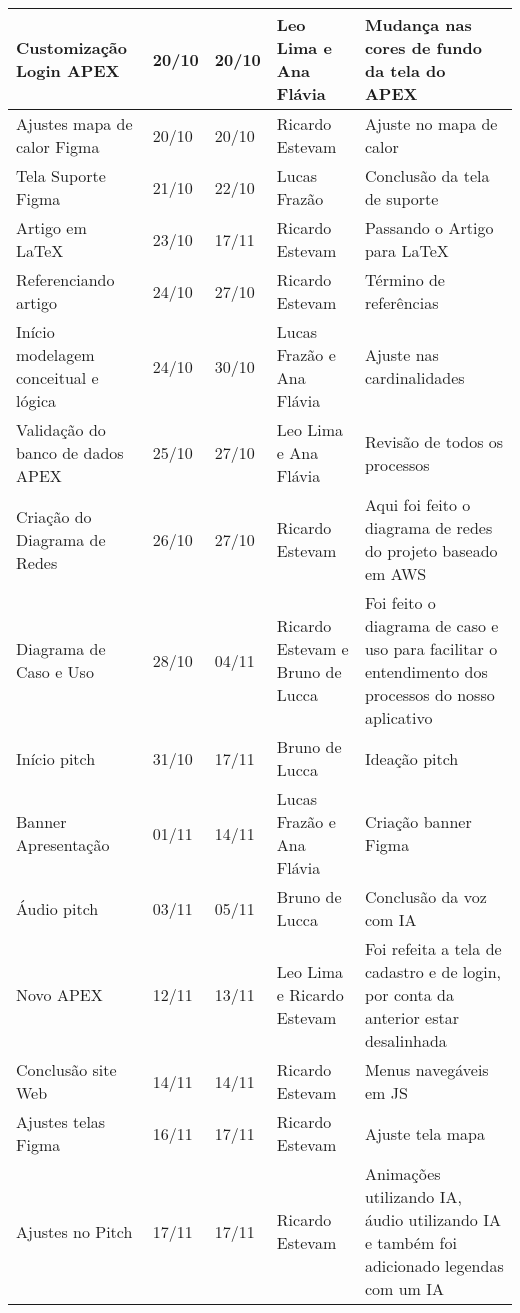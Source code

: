 \documentclass[
landscape,
  a4paper,%
  12pt,%
  english,%
  brazilian,%
]{article}
\begin{document}
\begin{table}[]
{\begin{tabular}{|l|l|l|l|l|}
Customização Login APEX             & 20/10 & 20/10 & Leo Lima e Ana Flávia & Mudança nas cores de fundo da tela do APEX \\ \hline
Ajustes mapa de calor Figma         & 20/10 & 20/10 & Ricardo Estevam & Ajuste no mapa de calor \\ \hline
Tela Suporte Figma                  & 21/10 & 22/10 & Lucas Frazão & Conclusão da tela de suporte \\ \hline
Artigo em LaTeX                     & 23/10 & 17/11 & Ricardo Estevam & Passando o Artigo para LaTeX \\ \hline
Referenciando artigo                & 24/10 & 27/10 & Ricardo Estevam & Término de referências \\ \hline
Início modelagem conceitual e lógica& 24/10 & 30/10 & Lucas Frazão e Ana Flávia & Ajuste nas cardinalidades \\ \hline
Validação do banco de dados APEX    & 25/10 & 27/10 & Leo Lima e Ana Flávia & Revisão de todos os processos \\ \hline
Criação do Diagrama de Redes        & 26/10 & 27/10 & Ricardo Estevam & Aqui foi feito o diagrama de redes do projeto baseado em AWS\\ \hline
Diagrama de Caso e Uso              & 28/10 & 04/11 & Ricardo Estevam e Bruno de Lucca & Foi feito o diagrama de caso e uso para facilitar o entendimento dos processos do nosso aplicativo\\ \hline
Início pitch                        & 31/10 & 17/11 & Bruno de Lucca & Ideação pitch \\ \hline
Banner Apresentação                 & 01/11 & 14/11 & Lucas Frazão e Ana Flávia & Criação banner Figma \\ \hline
Áudio pitch                         & 03/11 & 05/11 & Bruno de Lucca & Conclusão da voz com IA \\ \hline
Novo APEX                           & 12/11 & 13/11 & Leo Lima e Ricardo Estevam & Foi refeita a tela de cadastro e de login, por conta da anterior estar desalinhada \\ \hline
Conclusão site Web                  & 14/11 & 14/11 & Ricardo Estevam & Menus navegáveis em JS \\ \hline
Ajustes telas Figma                 & 16/11 & 17/11 & Ricardo Estevam & Ajuste tela mapa\\ \hline
Ajustes no Pitch                    & 17/11 & 17/11 & Ricardo Estevam & Animações utilizando IA, áudio utilizando IA e também foi adicionado legendas com um IA\\ \hline
\end{tabular}
}
\end{table}
\end{document}
